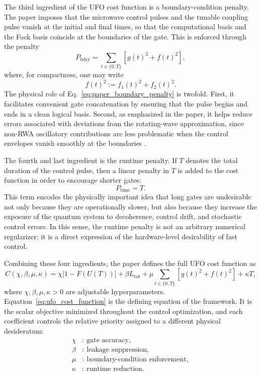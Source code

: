 The third ingredient of the UFO cost function is a boundary-condition penalty. The paper imposes that the microwave control pulses and the tunable coupling pulse vanish at the initial and final times, so that the computational basis and the Fock basis coincide at the boundaries of the gate. This is enforced through the penalty
\begin{equation}
P_{\mathrm{bdry}}
=
\sum_{t\in\{0,T\}}
\left[
g(t)^2 + f(t)^2
\right],
\label{eq:paper_boundary_penalty}
\end{equation}
where, for compactness, one may write
\begin{equation}
f(t)^2 := f_1(t)^2 + f_2(t)^2.
\label{eq:aggregate_drive_amplitude}
\end{equation}
The physical role of Eq.~\eqref{eq:paper_boundary_penalty} is twofold. First, it facilitates convenient gate concatenation by ensuring that the pulse begins and ends in a clean logical basis. Second, as emphasized in the paper, it helps reduce errors associated with deviations from the rotating-wave approximation, since non-RWA oscillatory contributions are less problematic when the control envelopes vanish smoothly at the boundaries \cite{Niu2019}.

The fourth and last ingredient is the runtime penalty. If \(T\) denotes the total duration of the control pulse, then a linear penalty in \(T\) is added to the cost function in order to encourage shorter gates:
\begin{equation}
P_{\mathrm{time}} = T.
\label{eq:paper_runtime_penalty}
\end{equation}
This term encodes the physically important idea that long gates are undesirable not only because they are operationally slower, but also because they increase the exposure of the quantum system to decoherence, control drift, and stochastic control errors. In this sense, the runtime penalty is not an arbitrary numerical regularizer; it is a direct expression of the hardware-level desirability of fast control.

Combining these four ingredients, the paper defines the full UFO cost function as
\begin{equation}
C(\chi,\beta,\mu,\kappa)
=
\chi\bigl[1-F(U(T))\bigr]
+
\beta L_{\mathrm{tot}}
+
\mu
\sum_{t\in\{0,T\}}
\left[
g(t)^2 + f(t)^2
\right]
+
\kappa T,
\label{eq:ufo_cost_function}
\end{equation}
where \(\chi,\beta,\mu,\kappa > 0\) are adjustable hyperparameters. Equation~\eqref{eq:ufo_cost_function} is the defining equation of the framework. It is the scalar objective minimized throughout the control optimization, and each coefficient controls the relative priority assigned to a different physical desideratum:
\begin{align}
\chi &:\ \text{gate accuracy}, \label{eq:weight_chi}\\
\beta &:\ \text{leakage suppression}, \label{eq:weight_beta}\\
\mu &:\ \text{boundary-condition enforcement}, \label{eq:weight_mu}\\
\kappa &:\ \text{runtime reduction}. \label{eq:weight_kappa}
\end{align}

